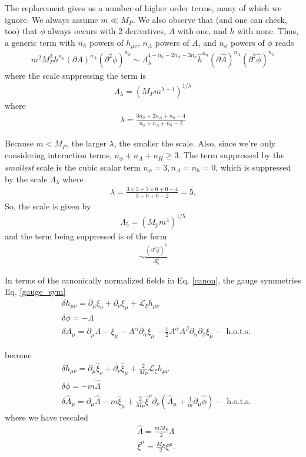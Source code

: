 \documentclass{book}
\theoremstyle{definition}
\newcommand{\p}{\partial}
\newcommand{\lag}{\mathcal{L}}
\newcommand{\nn}{\nonumber}
\newcommand{\al}{\alpha}
\newcommand{\be}{\beta}
\newcommand{\f}[2]{\frac{#1}{#2}}
\newcommand{\lp}{\left(}
\newcommand{\rp}{\right)}
\begin{document}
The replacement gives us a number of higher order terms, many of which we ignore. We always assume $m \ll M_P$. We also observe that (and one can check, too) that $\phi$ always occurs with 2 derivatives, $A$ with one, and $h$ with none. Thus, a generic term with $n_h$ powers of $h_{\mu\nu}$, $n_A$ powers of $A$, and $n_\phi$ powers of $\phi$ reads
\begin{align}
\boxed{m^2 M_P^2 h^{n_h}(\p A)^{n_A}(\p^2 \phi)^{n_\phi} \sim \Lambda_\lambda^{4-n_h-2n_A - 3n_\phi} \hat{h}^{n_h}(\p \hat{A})^{n_A}(\p^2 \hat{\phi})^{n_\phi}}
\end{align}
where the scale suppressing the term is 
\begin{align}
\boxed{\Lambda_\lambda = \lp M_P m ^{\lambda-1}\rp^{1/\lambda}}
\end{align}
where
\begin{align}
\boxed{\lambda = \f{3n_\phi + 2n_A + n_h - 4}{n_\phi + n_A + n_h - 2}}
\end{align}

Because $m< M_P$, the larger $\lambda$, the smaller the scale. Also, since we're only considering interaction terms, $n_\phi + n_A + n_H \geq 3$. The term suppressed by the \textit{smallest} scale is the cubic scalar term $n_\phi = 3, n_A = n_h = 0$, which is suppressed by the scale $\Lambda_\lambda$ where 
\begin{align}
\lambda = \f{3\times 3 + 2\times 0 + 0 - 4}{3 + 0 + 0 - 2} = 5.
\end{align}
So, the scale is given by
\begin{align}
\boxed{\Lambda_5 = (M_p m^4)^{1/5}}
\end{align}
and the term being suppressed is of the form
\begin{align}
\boxed{\sim \f{(\p^2 \hat{\phi})^3}{\Lambda_5^5}}
\end{align}


In terms of the canonically normalized fields in Eq. \eqref{canon}, the gauge symmetries Eq. \eqref{gauge_sym} 
\begin{align}
&\delta h_{\mu\nu} = \p_\mu \xi_\nu + \p_\nu \xi_\mu + \lag_\xi h_{\mu\nu}\nn\\
&\delta \phi = -\Lambda\nn\\
&\delta A_\mu = \p_\mu \Lambda -\xi_\mu - A^\al \p_\al \xi_\mu -\f{1}{2}A^\al A^\be \p_\al \p_\be \xi_\mu - \text{ h.o.t.s.}\nn
\end{align}

become
\begin{align}
&\delta h_{\mu\nu} = \p_\mu \hat\xi_\nu + \p_\nu \hat\xi_\mu + \f{2}{M_P}\lag_\xi h_{\mu\nu}\\
&\delta \phi = -m\hat\Lambda\\
&\delta \hat A_\mu = \p_\mu \hat\Lambda - m\hat\xi_\mu  + \f{2}{M_P}\hat\xi^\nu \p_\nu \lp \hat{A}_\mu + \f{1}{m}\p_\mu \hat{\phi} \rp - \text{ h.o.t.s.}
\end{align}
where we have rescaled
\begin{align}
&\hat\Lambda = \f{mM_P}{2}\Lambda \nn\\
&\hat{\xi}^\mu = \f{M_P}{2}\xi^\mu .
\end{align}
\end{document}
